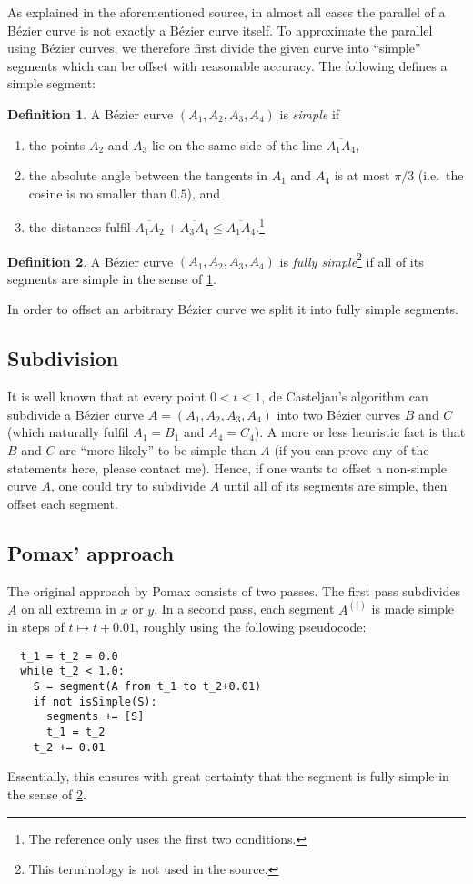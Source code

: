 \documentclass[12pt,a4paper]{article}
\theoremstyle{definition}
\newtheorem{definition}{Definition}[section]
\begin{document}
As explained in the aforementioned source, in almost all cases the parallel of a Bézier curve is not exactly a Bézier curve itself. To approximate the parallel using Bézier curves, we therefore first divide the given curve into ``simple'' segments which can be offset with reasonable accuracy. The following defines a simple segment:
\begin{definition}
  \label{def:simpleCurve}
  A Bézier curve $(A_1, A_2, A_3, A_4)$ is \emph{simple} if
  \begin{enumerate}
    \item the points $A_2$ and $A_3$ lie on the same side of the line $\overline{A_1A_4}$,
    \item the absolute angle between the tangents in $A_1$ and $A_4$ is at most $\pi/3$ (i.e.\ the cosine is no smaller than $0.5$), and
    \item the distances fulfil $\overline{A_1A_2} + \overline{A_3A_4} \leq \overline{A_1A_4}$.\footnote{The reference only uses the first two conditions.}
  \end{enumerate}
\end{definition}
\begin{definition}
  \label{def:fullySimpleCurve}
  A Bézier curve $(A_1, A_2, A_3, A_4)$ is \emph{fully simple}\footnote{This terminology is not used in the source.} if all of its segments are simple in the sense of \cref{def:simpleCurve}.
\end{definition}
In order to offset an arbitrary Bézier curve we split it into fully simple segments.

\subsection{Subdivision}

It is well known that at every point $0 < t < 1$, de Casteljau's algorithm can subdivide a Bézier curve $A = (A_1, A_2, A_3, A_4)$ into two Bézier curves $B$ and $C$ (which naturally fulfil $A_1 = B_1$ and $A_4 = C_4$). A more or less heuristic fact is that $B$ and $C$ are ``more likely'' to be simple than $A$ (if you can prove any of the statements here, please contact me). Hence, if one wants to offset a non-simple curve $A$, one could try to subdivide $A$ until all of its segments are simple, then offset each segment.

\subsection{Pomax' approach}
The original approach by Pomax consists of two passes. The first pass subdivides $A$ on all extrema in $x$ or $y$. In a second pass, each segment $A^{(i)}$ is made simple in steps of $t \mapsto t + 0.01$, roughly using the following pseudocode:
\begin{samepage}
\begin{verbatim}
  t_1 = t_2 = 0.0
  while t_2 < 1.0:
    S = segment(A from t_1 to t_2+0.01)
    if not isSimple(S):
      segments += [S]
      t_1 = t_2
    t_2 += 0.01
\end{verbatim}
\end{samepage}
Essentially, this ensures with great certainty that the segment is fully simple in the sense of \cref{def:fullySimpleCurve}.
\end{document}
